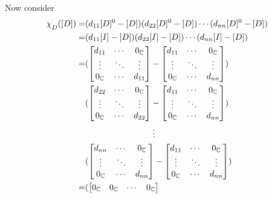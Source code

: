 \documentclass[12pt, letterpaper]{article}
\newcommand{\C}{\mathbb{C}}
\begin{document}
Now consider
\begin{align*}
\chi_{\raisebox{-.5ex}{$\scriptstyle D$}}([D]) 
	=& (d_{11}[D]^0 - [D])(d_{22}[D]^0 - [D]) \cdots (d_{nn}[D]^0 - [D]) \\
	=& (d_{11}[I] - [D])(d_{22}[I] - [D]) \cdots (d_{nn}[I] - [D]) \\
	=& (
		\begin{bmatrix}
		d_{11} & \cdots & 0_\C \\
		\vdots & \ddots & \vdots \\
		0_\C & \cdots & d_{11} \\
		\end{bmatrix}
		-
		\begin{bmatrix}
		d_{11} & \cdots & 0_\C \\
		\vdots & \ddots & \vdots \\
		0_\C & \cdots & d_{nn} \\
		\end{bmatrix}
		) \\
		&(
		\begin{bmatrix}
		d_{22} & \cdots & 0_\C \\
		\vdots & \ddots & \vdots \\
		0_\C & \cdots & d_{22} \\
		\end{bmatrix}
		-
		\begin{bmatrix}
		d_{11} & \cdots & 0_\C \\
		\vdots & \ddots & \vdots \\
		0_\C & \cdots & d_{nn} \\
		\end{bmatrix}
		) \\
		&\hspace{8em} \vdots \\
		&(
		\begin{bmatrix}
		d_{nn} & \cdots & 0_\C \\
		\vdots & \ddots & \vdots \\
		0_\C & \cdots & d_{nn} \\
		\end{bmatrix}
		-
		\begin{bmatrix}
		d_{11} & \cdots & 0_\C \\
		\vdots & \ddots & \vdots \\
		0_\C & \cdots & d_{nn} \\
		\end{bmatrix}
		) \\
	=& (
		\begin{bmatrix}
		0_\C & 0_\C & \cdots & 0_\C \\

\end{bmatrix}
\end{align*}
\end{document}
